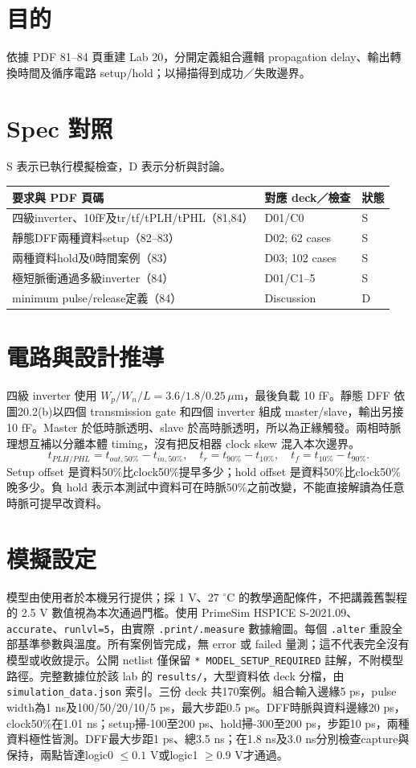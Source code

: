 \section{目的}
依據 PDF 81--84 頁重建 Lab 20，分開定義組合邏輯 propagation delay、輸出轉換時間及循序電路 setup/hold；以掃描得到成功／失敗邊界。

\section{Spec 對照}
S 表示已執行模擬檢查，D 表示分析與討論。

\small\begin{longtable}{p{.46\linewidth}p{.30\linewidth}p{.15\linewidth}}\toprule
要求與 PDF 頁碼 & 對應 deck／檢查 & 狀態 \\ \midrule\endhead
四級inverter、10fF及tr/tf/tPLH/tPHL（81,84） & D01/C0 & S \\
靜態DFF兩種資料setup（82--83） & D02; 62 cases & S \\
兩種資料hold及0時間案例（83） & D03; 102 cases & S \\
極短脈衝通過多級inverter（84） & D01/C1--5 & S \\
minimum pulse/release定義（84） & Discussion & D \\
\bottomrule\end{longtable}\normalsize


\section{電路與設計推導}
四級 inverter 使用 $W_p/W_n/L=3.6/1.8/0.25\,\mu$m，最後負載 10 fF。靜態 DFF 依圖20.2(b)以四個 transmission gate 和四個 inverter 組成 master/slave，輸出另接 10 fF。Master 於低時脈透明、slave 於高時脈透明，所以為正緣觸發。兩相時脈理想互補以分離本體 timing，沒有把反相器 clock skew 混入本次邊界。
\[t_{PLH/PHL}=t_{out,50\%}-t_{in,50\%},\quad t_r=t_{90\%}-t_{10\%},\quad t_f=t_{10\%}-t_{90\%}.\]
Setup offset 是資料50\%比clock50\%提早多少；hold offset 是資料50\%比clock50\%晚多少。負 hold 表示本測試中資料可在時脈50\%之前改變，不能直接解讀為任意時脈可提早改資料。

\section{模擬設定}
模型由使用者於本機另行提供；採 1 V、27 $^\circ$C 的教學適配條件，不把講義舊製程的 2.5 V 數值視為本次通過門檻。使用 PrimeSim HSPICE S-2021.09、\texttt{accurate}、\texttt{runlvl=5}，由實際 \texttt{.print/.measure} 數據繪圖。每個 \texttt{.alter} 重設全部基準參數與溫度。所有案例皆完成，無 error 或 failed 量測；這不代表完全沒有模型或收斂提示。公開 netlist 僅保留 \texttt{* MODEL\_SETUP\_REQUIRED} 註解，不附模型路徑。完整數據位於該 lab 的 \texttt{results/}，大型資料依 deck 分檔，由 \texttt{simulation\_data.json} 索引。三份 deck 共170案例。組合輸入邊緣5 ps，pulse width為1 ns及100/50/20/10/5 ps，最大步距0.5 ps。DFF時脈與資料邊緣20 ps，clock50\%在1.01 ns；setup掃-100至200 ps、hold掃-300至200 ps，步距10 ps，兩種資料極性皆測。DFF最大步距1 ps、總3.5 ns；在1.8 ns及3.0 ns分別檢查capture與保持，兩點皆達logic0 $\le0.1$ V或logic1 $\ge0.9$ V才通過。

